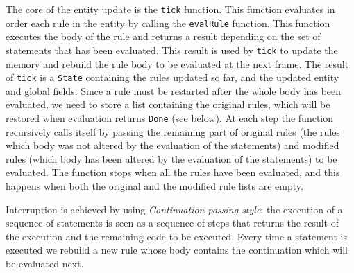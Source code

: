 The core of the entity update is the \texttt{tick} function. This function evaluates in order each rule in the entity by calling the \texttt{evalRule} function. This function executes the body of the rule and returns a result depending on the set of statements that has been evaluated. This result is used by \texttt{tick} to update the memory and rebuild the rule body to be evaluated at the next frame. The result of \texttt{tick} is a \texttt{State} containing the rules updated so far, and the updated entity and global fields. Since a rule must be restarted after the whole body has been evaluated, we need to store a list containing the original rules, which will be restored when evaluation returns \texttt{Done} (see below). At each step the function recursively calls itself by passing the remaining part of original rules (the rules which body was not altered by the evaluation of the statements) and modified rules (which body has been altered by the evaluation of the statements) to be evaluated. The function stops when all the rules have been evaluated, and this happens when both the original and the modified rule lists are empty.

Interruption is achieved by using \textit{Continuation passing style}: the execution of a sequence of statements is seen as a sequence of steps that returns the result of the execution and the remaining code to be executed. Every time a statement is executed we rebuild a new rule whose body contains the continuation which will be evaluated next. 

